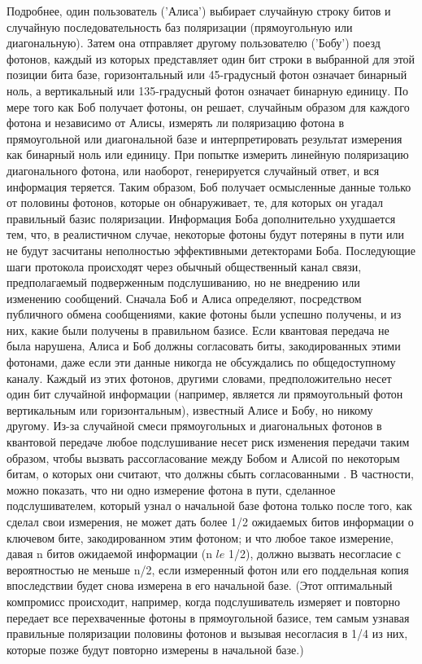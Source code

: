 Подробнее, один пользователь ('Алиса') выбирает случайную строку битов и случайную последовательность баз поляризации (прямоугольную или диагональную). Затем она отправляет другому пользователю ('Бобу') поезд фотонов, каждый из которых представляет один бит строки в выбранной для этой позиции бита базе, горизонтальный или 45-градусный фотон означает бинарный ноль, а вертикальный или 135-градусный фотон означает бинарную единицу. По мере того как Боб получает фотоны, он решает, случайным образом для каждого фотона и независимо от Алисы, измерять ли поляризацию фотона в прямоугольной или диагональной базе и интерпретировать результат измерения как бинарный ноль или единицу.  При попытке измерить линейную поляризацию диагонального фотона, или наоборот, генерируется случайный ответ, и вся информация теряется. Таким образом, Боб получает осмысленные данные только от половины фотонов, которые он обнаруживает, те, для которых он угадал правильный базис поляризации. Информация Боба дополнительно ухудшается тем, что, в реалистичном случае, некоторые фотоны будут потеряны в пути или не будут засчитаны неполностью эффективными детекторами Боба. Последующие шаги протокола происходят через обычный общественный канал связи, предполагаемый подверженным подслушиванию, но не внедрению или изменению сообщений. Сначала Боб и Алиса определяют, посредством публичного обмена сообщениями, какие фотоны были успешно получены, и из них, какие были получены в правильном базисе. Если квантовая передача не была нарушена, Алиса и Боб должны согласовать  биты, закодированных этими фотонами, даже если эти данные никогда не обсуждались по общедоступному каналу. Каждый из этих фотонов, другими словами, предположительно несет один бит случайной информации (например, является ли прямоугольный фотон вертикальным или горизонтальным), известный Алисе и Бобу, но никому другому.
Из-за случайной смеси прямоугольных и диагональных фотонов в квантовой передаче любое подслушивание несет риск изменения передачи таким образом, чтобы вызвать рассогласование между Бобом и Алисой по некоторым битам, о которых они считают, что должны сбыть согласованными . В частности, можно показать, что ни одно измерение фотона в пути, сделанное подслушивателем, который узнал о начальной базе фотона только после того, как сделал свои измерения, не может дать более 1/2 ожидаемых битов информации о ключевом бите, закодированном этим фотоном; и что любое такое измерение, давая n битов ожидаемой информации (n $le$ 1/2), должно вызвать несогласие с вероятностью не меньше n/2, если измеренный фотон или его поддельная копия впоследствии будет снова измерена в его начальной базе. (Этот оптимальный компромисс происходит, например, когда подслушиватель измеряет и повторно передает все перехваченные фотоны в прямоугольной базисе, тем самым узнавая правильные поляризации половины фотонов и вызывая несогласия в 1/4 из них, которые позже будут повторно измерены в начальной базе.)
